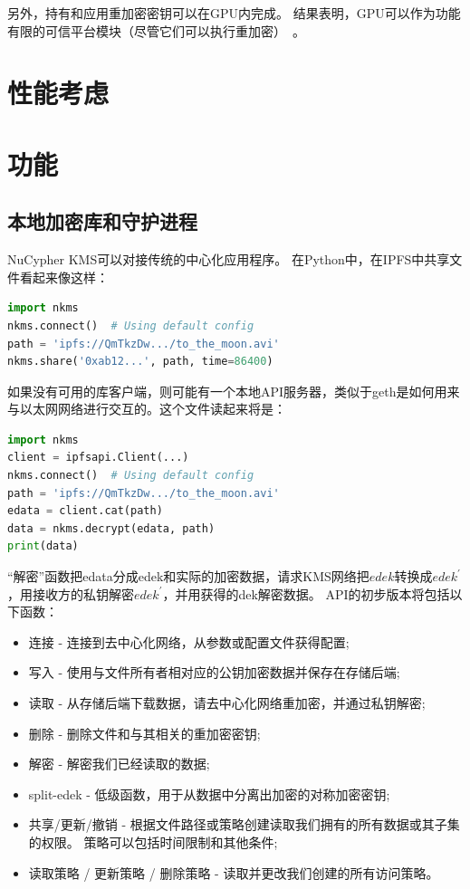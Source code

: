 \documentclass[longbibliography,nofootinbib]{revtex4-1}
\begin{document}
    另外，持有和应用重加密密钥可以在GPU内完成。 结果表明，GPU可以作为功能有限的可信平台模块（尽管它们可以执行重加密）~\cite{gpu-trusted}。


\section{性能考虑}

\section{功能}

\subsection{本地加密库和守护进程}

NuCypher KMS可以对接传统的中心化应用程序。 在Python中，在IPFS中共享文件看起来像这样：

\begin{lstlisting}[frame=single,language=Python]
import nkms
nkms.connect()  # Using default config
path = 'ipfs://QmTkzDw.../to_the_moon.avi'
nkms.share('0xab12...', path, time=86400)
\end{lstlisting}

如果没有可用的库客户端，则可能有一个本地API服务器，类似于geth是如何用来与以太网网络进行交互的。这个文件读起来将是：

\begin{lstlisting}[frame=single,language=Python]
import nkms
client = ipfsapi.Client(...)
nkms.connect()  # Using default config
path = 'ipfs://QmTkzDw.../to_the_moon.avi'
edata = client.cat(path)
data = nkms.decrypt(edata, path)
print(data)
\end{lstlisting}

“解密”函数把edata分成edek和实际的加密数据，请求KMS网络把$edek$转换成$edek^{\prime}$，用接收方的私钥解密$edek^{\prime}$，并用获得的dek解密数据。
  API的初步版本将包括以下函数：

\begin{itemize}
    \item 连接 - 连接到去中心化网络，从参数或配置文件获得配置;
    \item 写入 - 使用与文件所有者相对应的公钥加密数据并保存在存储后端;
    \item 读取 - 从存储后端下载数据，请去中心化网络重加密，并通过私钥解密;
    \item 删除 - 删除文件和与其相关的重加密密钥;
    \item 解密 - 解密我们已经读取的数据;
    \item split-edek - 低级函数，用于从数据中分离出加密的对称加密密钥;
    \item 共享/更新/撤销 - 根据文件路径或策略创建读取我们拥有的所有数据或其子集的权限。 策略可以包括时间限制和其他条件;
    \item 读取策略 / 更新策略 / 删除策略 - 读取并更改我们创建的所有访问策略。
\end{itemize}
\end{document}
